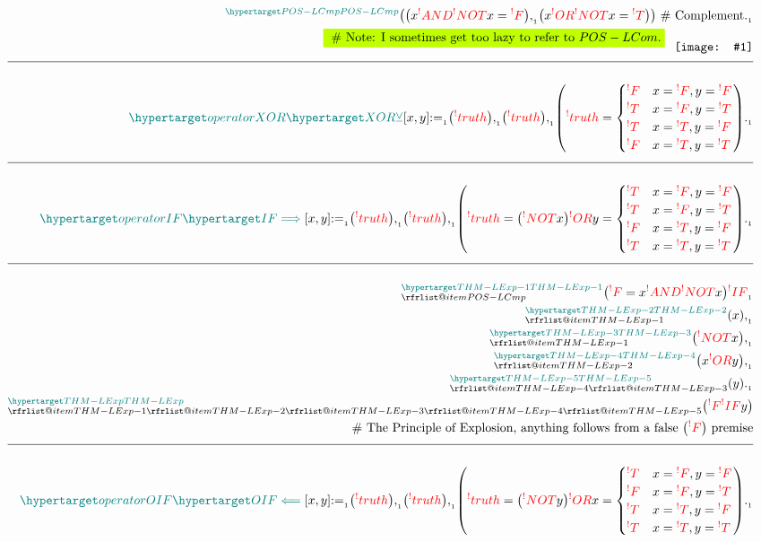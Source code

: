 \documentclass[a4paper]{article}
\makeatletter
\def\ml{\mleft}
\def\mr{\mright}
\newcommand*{\img}[1]{%
    \raisebox{-0.5\baselineskip}{%
        \texttt{[image: \#1]}%
    }%
}
\newcommand{\tdb}[1]{\colorbox{lime}{$\displaystyle #1$}}
\newcommand{\defeq}{:=}
\newcommand{\eq}{=}
\newcommand{\cusand}{,}
\newcommand{\cusend}{.}
\newcommand{\cusnum}[2]{{#1}_{{\phantom{ }}_{#2}}}
\newcommand{\eqComment}[1]{\text{  \# #1}}
\newcommand{\n}{\\[1.5ex] \hline \nonumber \\[0ex]}
\newcommand{\m}{\nonumber \\}
\newcommand\rfrlist[1]{%
    \forcsvlist{\rfrlist@item}{#1}
}
\newcommand\rfrlist@item[1]{\rfr{#1}\\}
\newcommand{\thmlink}[2]{{}_{\substack{\rfrlist{#1}}}^{\dfn{#2}} }
\makeatother
\begin{document}
\begin{tcolorbox}
\begin{align}
\m \thmlink{}{POS-LCmp} \ml(\ml(x \rfr{AND} \rfr{NOT} x \eq \rfr{F}\mr) \cusnum{\cusand}{1} \ml(x \rfr{OR} \rfr{NOT} x \eq \rfr{T}\mr)\mr) \eqComment{Complement} \cusnum{\cusend}{1}
\m \tdb{\eqComment{Note: I sometimes get too lazy to refer to $POS-LCom$.}} \phantom{\_} \img{my-b.jpg}
    \n \dfn{operatorXOR} [\dfn{XOR}[\veebar]][x, y] \cusnum{\defeq}{1} \ml(\rfr{truth} [x][]\mr) \cusnum{\cusand}{1} \ml(\rfr{truth} [y][]\mr) \cusnum{\cusand}{1} \ml(\rfr{truth} [x \rfr{XOR} y][] \eq \begin{cases} \rfr{F} & x \eq \rfr{F} \cusand y \eq \rfr{F} \\ \rfr{T} & x \eq \rfr{F} \cusand y \eq \rfr{T} \\ \rfr{T} & x \eq \rfr{T} \cusand y \eq \rfr{F} \\ \rfr{F} & x \eq \rfr{T} \cusand y \eq \rfr{T} \end{cases}\mr) \cusnum{\cusend}{1}
    \n \dfn{operatorIF} [\dfn{IF}[\implies]][x, y] \cusnum{\defeq}{1} \ml(\rfr{truth} [x][]\mr) \cusnum{\cusand}{1} \ml(\rfr{truth} [y][]\mr) \cusnum{\cusand}{1} \ml(\rfr{truth} [x \rfr{IF} y][] \eq \ml(\rfr{NOT} x\mr) \rfr{OR} y \eq \begin{cases} \rfr{T} & x \eq \rfr{F} \cusand y \eq \rfr{F} \\ \rfr{T} & x \eq \rfr{F} \cusand y \eq \rfr{T} \\ \rfr{F} & x \eq \rfr{T} \cusand y \eq \rfr{F} \\ \rfr{T} & x \eq \rfr{T}\cusand y \eq \rfr{T} \end{cases}\mr) \cusnum{\cusend}{1}
    \n \thmlink{POS-LCmp}{THM-LExp-1} \ml(\rfr{F} \eq x \rfr{AND} \rfr{NOT} x\mr) \cusnum{\rfr{IF}}{1}
\m \thmlink{THM-LExp-1}{THM-LExp-2} \ml(x\mr) \cusnum{\cusand}{1}
\m \thmlink{THM-LExp-1}{THM-LExp-3} \ml(\rfr{NOT} x\mr) \cusnum{\cusand}{1}
\m \thmlink{THM-LExp-2}{THM-LExp-4} \ml(x \rfr{OR} y\mr) \cusnum{\cusand}{1}
\m \thmlink{THM-LExp-4, THM-LExp-3}{THM-LExp-5} \ml(y\mr) \cusnum{\cusend}{1}
\m \thmlink{THM-LExp-1, THM-LExp-2, THM-LExp-3, THM-LExp-4, THM-LExp-5}{THM-LExp} \ml(\rfr{F} \rfr{IF} y\mr)
\m \eqComment{The Principle of Explosion, anything follows from a false $\ml(\rfr{F}\mr)$ premise}
    \n \dfn{operatorOIF} [\dfn{OIF}[\impliedby]][x, y] \cusnum{\defeq}{1} \ml(\rfr{truth} [x][]\mr) \cusnum{\cusand}{1} \ml(\rfr{truth} [y][]\mr) \cusnum{\cusand}{1} \ml(\rfr{truth} [x \rfr{OIF} y][] \eq \ml(\rfr{NOT} y\mr) \rfr{OR} x \eq \begin{cases} \rfr{T} & x \eq \rfr{F} \cusand y \eq \rfr{F} \\ \rfr{F} & x \eq \rfr{F} \cusand y \eq \rfr{T} \\ \rfr{T} & x \eq \rfr{T} \cusand y \eq \rfr{F} \\ \rfr{T} & x \eq \rfr{T} \cusand y \eq \rfr{T} \end{cases}\mr) \cusnum{\cusend}{1}

\end{align}
\end{tcolorbox}
\end{document}
